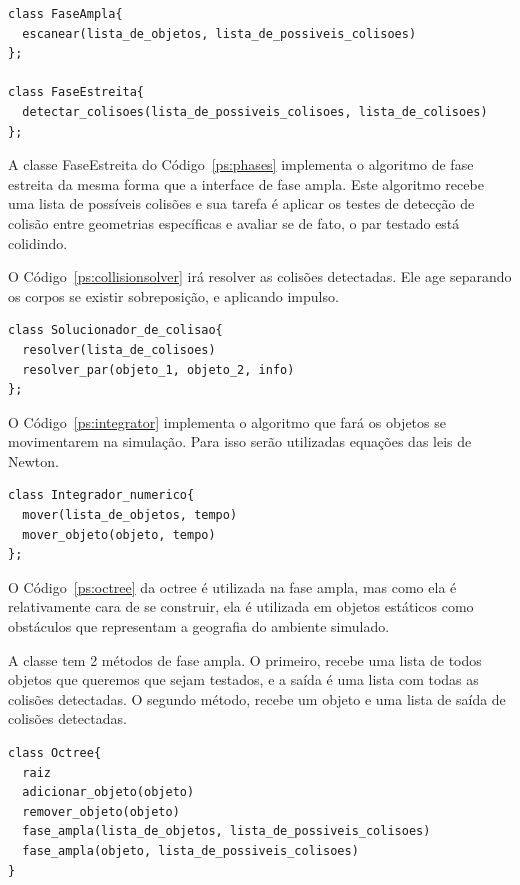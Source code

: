 \begin{lstlisting}[frame=single,caption=Modelagem prévia para fase ampla e estreita\label{ps:phases}]
class FaseAmpla{
  escanear(lista_de_objetos, lista_de_possiveis_colisoes)
};

class FaseEstreita{
  detectar_colisoes(lista_de_possiveis_colisoes, lista_de_colisoes)
};
\end{lstlisting}

A classe FaseEstreita do Código~\ref{ps:phases} implementa o algoritmo de fase estreita da mesma forma que a interface de fase ampla. Este algoritmo recebe uma lista de possíveis colisões e sua tarefa é aplicar os testes de detecção de colisão entre geometrias específicas e avaliar se de fato, o par testado está colidindo.

O Código~\ref{ps:collisionsolver} irá resolver as colisões detectadas. Ele age separando os corpos se existir sobreposição, e aplicando impulso.
\begin{lstlisting}[frame=single,caption=Modelagem prévia para solucionador de colisões\label{ps:collisionsolver}]
class Solucionador_de_colisao{
  resolver(lista_de_colisoes)
  resolver_par(objeto_1, objeto_2, info)
};
\end{lstlisting}

O Código~\ref{ps:integrator} implementa o algoritmo que fará os objetos se movimentarem na simulação. Para isso serão utilizadas equações das leis de Newton.

\begin{lstlisting}[frame=single,caption=Modelagem prévia para integrador numérico\label{ps:integrator}]
class Integrador_numerico{
  mover(lista_de_objetos, tempo)
  mover_objeto(objeto, tempo)
};
\end{lstlisting}


O Código~\ref{ps:octree} da octree é utilizada na fase ampla, mas como ela é relativamente cara de se construir, ela é utilizada em objetos estáticos como obstáculos que representam a geografia do ambiente simulado. 

A classe tem 2 métodos de fase ampla. O primeiro, recebe uma lista de todos objetos que queremos que sejam testados, e a saída é uma lista com todas as colisões detectadas. O segundo método, recebe um objeto e uma lista de saída de colisões detectadas.

\begin{lstlisting}[frame=single,caption=Modelagem prévia para octree\label{ps:octree}]
class Octree{
  raiz
  adicionar_objeto(objeto)
  remover_objeto(objeto)
  fase_ampla(lista_de_objetos, lista_de_possiveis_colisoes)
  fase_ampla(objeto, lista_de_possiveis_colisoes)
}
\end{lstlisting}

